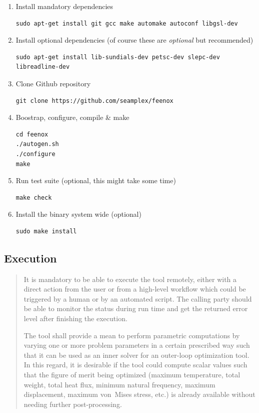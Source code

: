 \documentclass[
  american,
]{article}
\begin{document}
\begin{enumerate}
\def\labelenumi{\arabic{enumi}.}
\item
  Install mandatory dependencies

\begin{lstlisting}
sudo apt-get install git gcc make automake autoconf libgsl-dev
\end{lstlisting}
\item
  Install optional dependencies (of course these are \emph{optional} but
  recommended)

\begin{lstlisting}
sudo apt-get install lib-sundials-dev petsc-dev slepc-dev libreadline-dev
\end{lstlisting}
\item
  Clone Github repository

\begin{lstlisting}
git clone https://github.com/seamplex/feenox
\end{lstlisting}
\item
  Boostrap, configure, compile \& make

\begin{lstlisting}
cd feenox
./autogen.sh
./configure
make
\end{lstlisting}
\item
  Run test suite (optional, this might take some time)

\begin{lstlisting}
make check
\end{lstlisting}
\item
  Install the binary system wide (optional)

\begin{lstlisting}
sudo make install
\end{lstlisting}
\end{enumerate}

\hypertarget{sec:execution}{%
\subsection{Execution}\label{sec:execution}}

\begin{quote}
It is mandatory to be able to execute the tool remotely, either with a
direct action from the user or from a high-level workflow which could be
triggered by a human or by an automated script. The calling party should
be able to monitor the status during run time and get the returned error
level after finishing the execution.

The tool shall provide a mean to perform parametric computations by
varying one or more problem parameters in a certain prescribed way such
that it can be used as an inner solver for an outer-loop optimization
tool. In this regard, it is desirable if the tool could compute scalar
values such that the figure of merit being optimized (maximum
temperature, total weight, total heat flux, minimum natural frequency,
maximum displacement, maximum von~Mises stress, etc.) is already
available without needing further post-processing.
\end{quote}
\end{document}
